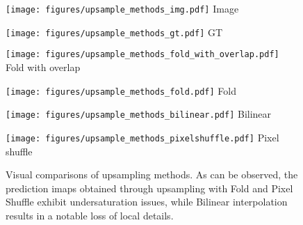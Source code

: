 \documentclass[lettersize,journal]{IEEEtran}
\begin{document}
\begin{figure}
	\centering \begin{minipage}[t]{0.07\textwidth}
		\centering
		\texttt{[image: figures/upsample\_methods\_img.pdf]}
		\centering\footnotesize{Image}
	\end{minipage}
	\begin{minipage}[t]{0.07\textwidth}
		\centering
		\texttt{[image: figures/upsample\_methods\_gt.pdf]}
		\centering\footnotesize{GT}
	\end{minipage}
	\begin{minipage}[t]{0.07\textwidth}
		\centering
		\texttt{[image: figures/upsample\_methods\_fold\_with\_overlap.pdf]}
		\centering\footnotesize{Fold with overlap}
	\end{minipage}
	\begin{minipage}[t]{0.07\textwidth}
		\centering
		\texttt{[image: figures/upsample\_methods\_fold.pdf]}
		\centering\footnotesize{Fold}
	\end{minipage}
	\begin{minipage}[t]{0.07\textwidth}
		\centering
		\texttt{[image: figures/upsample\_methods\_bilinear.pdf]}
		\centering\footnotesize{Bilinear}
	\end{minipage}
\begin{minipage}[t]{0.07\textwidth}
		\centering
		\texttt{[image: figures/upsample\_methods\_pixelshuffle.pdf]}
		\centering\footnotesize{Pixel shuffle}
	\end{minipage}
	\begin{minipage}[t]{0.07\textwidth}\end{minipage}
	\par\;\caption{Visual comparisons of upsampling methods. 
		As can be observed, the prediction imaps obtained through upsampling with Fold and Pixel Shuffle exhibit undersaturation issues, while Bilinear interpolation results in a notable loss of local details. 
	}
	\label{fig:upsample}
\end{figure}
	
\end{document}
